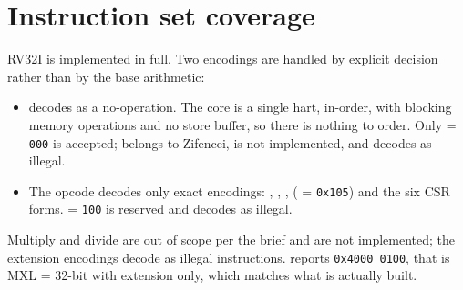 \section{Instruction set coverage}

RV32I is implemented in full. Two encodings are handled by explicit decision
rather than by the base arithmetic:

\begin{itemize}[nosep]
  \item {} decodes as a no-operation. The core is a single hart, in-order,
        with blocking memory operations and no store buffer, so there is nothing
        to order. Only  = \texttt{000} is accepted; 
        belongs to Zifencei, is not implemented, and decodes as illegal.
  \item The  opcode decodes only exact encodings: ,
        , ,  ( = \texttt{0x105}) and the
        six CSR forms.  = \texttt{100} is reserved and decodes as
        illegal.
\end{itemize}

Multiply and divide are out of scope per the brief and are not implemented; the
 extension encodings decode as illegal instructions.  reports
\texttt{0x4000\_0100}, that is MXL = 32-bit with extension  only, which
matches what is actually built.
